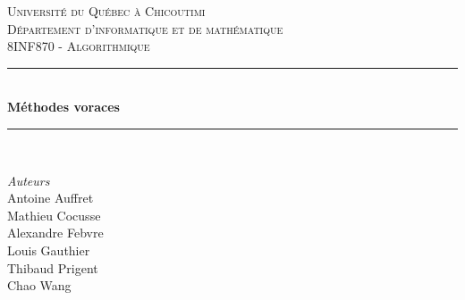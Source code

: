 \documentclass[french,12pt]{article} %
\begin{document}
	

\begin{titlepage} %
	\newcommand{\HRule}{\rule{\linewidth}{0.5mm}} %
	
	\center %
	
	
	\textsc{\LARGE Université du Québec à Chicoutimi}\\[1.5cm] %
	
	\textsc{\Large Département d'informatique et de mathématique}\\[0.5cm] %
	
	\textsc{\large 8INF870 - Algorithmique }\\[0.5cm] %
	
	
	\HRule\\[0.4cm]
	
	{\huge\bfseries Méthodes voraces }\\[0.4cm] %
	
	\HRule\\[1.5cm]
	
	

		\begin{center}
			\large
			\textit{Auteurs}\\
			Antoine Auffret
			\\
			Mathieu Cocusse
			\\
			Alexandre Febvre
			\\
			Louis Gauthier
			\\
			Thibaud Prigent
			\\
			Chao Wang
		\end{center}



\end{titlepage}
\end{document}
